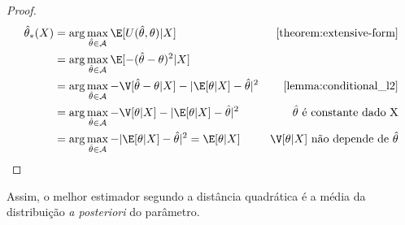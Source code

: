 \begin{proof}
\begin{align*}
 \hat{\theta}_{*}(X)
 &= \arg\max_{\hat{\theta} \in \mathcal{A}}
 \E[U(\hat{\theta},\theta)|X]
 & \text{\cref{theorem:extensive-form}} \\
 &= \arg\max_{\hat{\theta} \in \mathcal{A}}
 \E[-(\hat{\theta}-\theta)^{2}|X] \\
 &= \arg\max_{\hat{\theta} \in \mathcal{A}}
 -\V[\hat{\theta}-\theta|X] 
 -|\E[\theta|X]-\hat{\theta}|^{2}
 & \text{\cref{lemma:conditional_l2}} \\
 &= \arg\max_{\hat{\theta} \in \mathcal{A}}
 -\V[\theta|X] - |\E[\theta|X]-\hat{\theta}|^{2}
 &\hat{\theta} \text{ é constante dado X} \\
 &= \arg\max_{\hat{\theta} \in \mathcal{A}}
 -|\E[\theta|X]-\hat{\theta}|^{2} = \E[\theta|X]			  & \V[\theta|X] \text{ não depende de } \hat{\theta}
\end{align*}
\end{proof}

Assim, o melhor estimador segundo 
a distância quadrática é 
a média da distribuição 
\emph{a posteriori} do parâmetro.

